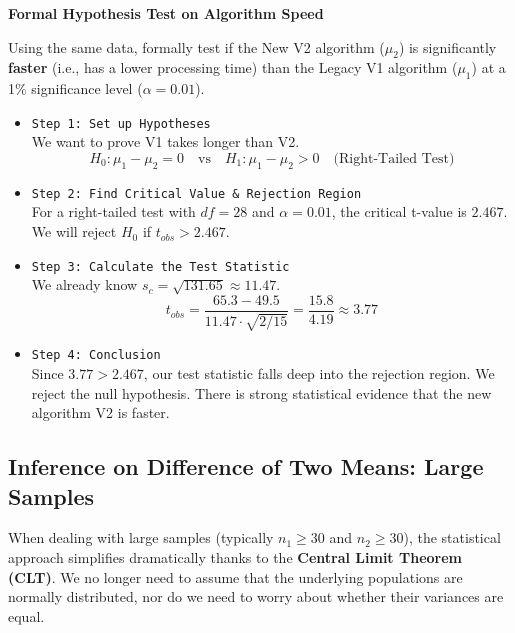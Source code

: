 \vspace{0.2cm}
\begin{example}{\textbf{Formal Hypothesis Test on Algorithm Speed}}

Using the same data, formally test if the New V2 algorithm ($\mu_2$) is significantly \textbf{faster} (i.e., has a lower processing time) than the Legacy V1 algorithm ($\mu_1$) at a 1\% significance level ($\alpha=0.01$).

\begin{itemize}
    \item \texttt{Step 1: Set up Hypotheses} \\
    We want to prove V1 takes longer than V2.
    $$ H_0: \mu_1 - \mu_2 = 0 \quad \text{vs} \quad H_1: \mu_1 - \mu_2 > 0 \quad \text{(Right-Tailed Test)} $$
    
    \item \texttt{Step 2: Find Critical Value \& Rejection Region} \\
    For a right-tailed test with $df=28$ and $\alpha=0.01$, the critical t-value is $2.467$. \\
    We will reject $H_0$ if $t_{obs} > 2.467$.
    
    \item \texttt{Step 3: Calculate the Test Statistic} \\
    We already know $s_c = \sqrt{131.65} \approx 11.47$.
    $$ t_{obs} = \frac{65.3 - 49.5}{11.47 \cdot \sqrt{2/15}} = \frac{15.8}{4.19} \approx 3.77 $$
    
    \item \texttt{Step 4: Conclusion} \\
    Since $3.77 > 2.467$, our test statistic falls deep into the rejection region. We reject the null hypothesis. There is strong statistical evidence that the new algorithm V2 is faster.
\end{itemize}
\end{example}


\subsection{Inference on Difference of Two Means: Large Samples}

When dealing with large samples (typically $n_1 \ge 30$ and $n_2 \ge 30$), the statistical approach simplifies dramatically thanks to the \textbf{Central Limit Theorem (CLT)}. We no longer need to assume that the underlying populations are normally distributed, nor do we need to worry about whether their variances are equal.

